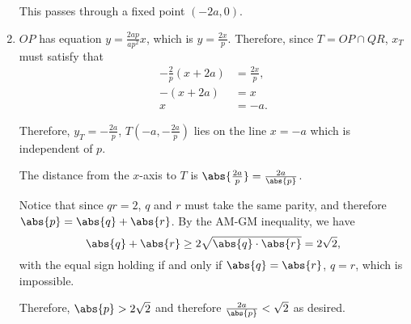 \begin{enumerate}
          This passes through a fixed point \((-2a, 0)\).

    \item \(OP\) has equation \(y = \frac{2ap}{ap^2}x\), which is \(y = \frac{2x}{p}\).
          Therefore, since \(T = OP \cap QR\), \(x_T\) must satisfy that
          \begin{align*}
              -\frac{2}{p} (x + 2a) & = \frac{2x}{p}, \\
              -(x + 2a)             & = x             \\
              x                     & = -a.
          \end{align*}

          Therefore, \(y_T = -\frac{2a}{p}\), \(T\left(-a, -\frac{2a}{p}\right)\) lies on the line \(x = -a\) which is independent of \(p\).

          The distance from the \(x\)-axis to \(T\) is \(\abs{\frac{2a}{p}} = \frac{2a}{\abs{p}}\).

          Notice that since \(qr = 2\), \(q\) and \(r\) must take the same parity, and therefore \(\abs{p} = \abs{q} + \abs{r}\). By the AM-GM inequality, we have
          \[
              \abs{q} + \abs{r} \geq 2 \sqrt{\abs{q} \cdot \abs{r}} = 2\sqrt{2},
          \]
          with the equal sign holding if and only if \(\abs{q} = \abs{r}\), \(q = r\), which is impossible.

          Therefore, \(\abs{p} > 2\sqrt{2}\) and therefore \(\frac{2a}{\abs{p}} < \sqrt{2}\) as desired.
\end{enumerate}